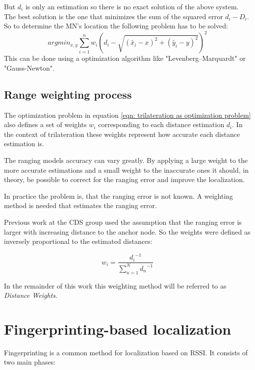 But \(d_{i}\) is only an estimation so there is no exact solution of the above system. The best solution is the one that minimizes the sum of the squared error \(d_{i} - D_{i}\). So to determine the MN's location the following problem has to be solved:
\begin{equation}
argmin_{x,y}\sum_{i=1}^{n}w_{i}\left ( d_{i} - \sqrt{\left ( \tilde{x_{i}}-x \right )^{2}+\left ( \tilde{y_{i}}-y \right )^{2}} \right )^{2}
\label{eqn: trilateration as optimization problem}
\end{equation}
This can be done using a optimization algorithm like "Levenberg–Marquardt" or "Gauss-Newton".

\subsection{Range weighting process}

The optimization problem in equation \ref{eqn: trilateration as optimization problem} also defines a set of weights $w_i$ corresponding to each distance estimation $d_i$. In the context of trilateration these weights represent how accurate each distance estimation is.

The ranging models accuracy can vary greatly. By applying a large weight to the more accurate estimations and a small weight to the inaccurate ones it should, in theory, be possible to correct for the ranging error and improve the localization.

In practice the problem is, that the ranging error is not known. A weighting method is needed that estimates the ranging error.

Previous work at the CDS group \cite{FineGrainedIndoorTracking} used the assumption that the ranging error is larger with increasing distance to the anchor node. So the weights were defined as inversely proportional to the estimated distances:

\begin{equation}
w_{i}=\frac{{d_i}^{-1}}{\sum_{n=1}^{N}{d_n}^{-1}}
\label{eqn: distance weights}
\end{equation}

In the remainder of this work this weighting method will be referred to as \emph{Distance Weights}.

\section{Fingerprinting-based localization}

Fingerprinting is a common method for localization based on RSSI\cite{chapre2013RSSI}. It consists of two main phases:

